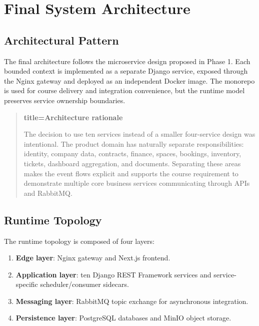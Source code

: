\documentclass[12pt,a4paper]{report}
\newenvironment{infobox}[1][]{\begin{quote}\noindent\textbf{#1}\par\smallskip}{\end{quote}}
\begin{document}
\chapter{Final System Architecture}
\label{ch:architecture}

\section{Architectural Pattern}
\label{sec:architectural-pattern}

The final architecture follows the microservice design proposed in Phase 1. Each
bounded context is implemented as a separate Django service, exposed through the
Nginx gateway and deployed as an independent Docker image. The monorepo is used
for course delivery and integration convenience, but the runtime model preserves
service ownership boundaries.

\begin{infobox}[title=Architecture rationale]
The decision to use ten services instead of a smaller four-service design was
intentional. The product domain has naturally separate responsibilities: identity,
company data, contracts, finance, spaces, bookings, inventory, tickets,
dashboard aggregation, and documents. Separating these areas makes the event
flows explicit and supports the course requirement to demonstrate multiple core
business services communicating through APIs and RabbitMQ.
\end{infobox}

\section{Runtime Topology}
\label{sec:runtime-topology}

The runtime topology is composed of four layers:
\begin{enumerate}
  \item \textbf{Edge layer}: Nginx gateway and Next.js frontend.
  \item \textbf{Application layer}: ten Django REST Framework services and
  service-specific scheduler/consumer sidecars.
  \item \textbf{Messaging layer}: RabbitMQ topic exchange for asynchronous
  integration.
  \item \textbf{Persistence layer}: PostgreSQL databases and MinIO object
  storage.
\end{enumerate}
\end{document}
